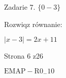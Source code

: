 \documentclass[a4paper,12pt]{article}
\begin{document}
Zadarie 7. $\{0-3\}$

Rozwiqz równanie:

$|x-3|=2x+11$

Strona 6 z26

$\mathrm{E}\mathrm{M}\mathrm{A}\mathrm{P}-\mathrm{R}0_{-}10$
\end{document}
